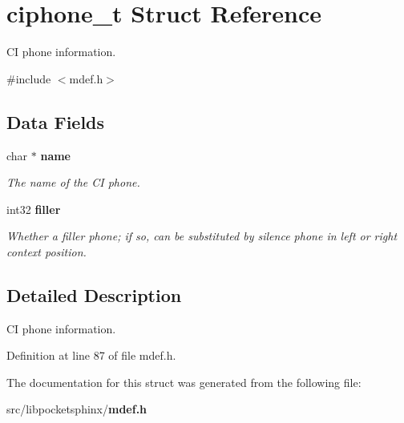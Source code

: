 \section{ciphone\+\_\+t Struct Reference}
\label{structciphone__t}


C\+I phone information.  




{\ttfamily \#include $<$mdef.\+h$>$}

\subsection*{Data Fields}
\begin{DoxyCompactItemize}
\item 
char $\ast$ {\bf name}\label{structciphone__t_a2327c5f09fa245c25926c718fdab642d}

\begin{DoxyCompactList}\small\item\em The name of the C\+I phone. \end{DoxyCompactList}\item 
int32 {\bf filler}\label{structciphone__t_a96e20b175c00c4edcd75d922dba067cd}

\begin{DoxyCompactList}\small\item\em Whether a filler phone; if so, can be substituted by silence phone in left or right context position. \end{DoxyCompactList}\end{DoxyCompactItemize}


\subsection{Detailed Description}
C\+I phone information. 

Definition at line 87 of file mdef.\+h.



The documentation for this struct was generated from the following file\+:\begin{DoxyCompactItemize}
\item 
src/libpocketsphinx/{\bf mdef.\+h}\end{DoxyCompactItemize}
